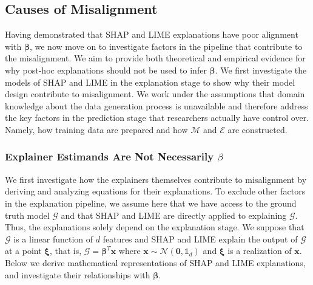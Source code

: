 \documentclass[mnsc,blindrev]{informs3}
\begin{document}
    \subsection{Causes of Misalignment}
        \label{sec:causes_of_misalignment}
        Having demonstrated that SHAP and LIME explanations have poor alignment with $\boldsymbol{\beta}$, we now move on to investigate factors in the pipeline that contribute to the misalignment. We aim to provide both theoretical and empirical evidence for why post-hoc explanations should not be used to infer $\boldsymbol{\beta}$. We first investigate the models of SHAP and LIME in the explanation stage to show why their model design contribute to misalignment. We work under the assumptions that domain knowledge about the data generation process is unavailable and therefore address the key factors in the prediction stage that researchers actually have control over. Namely, how training data are prepared and how $\mathcal{M}$ and $\mathcal{E}$ are constructed.%


    \subsubsection{Explainer Estimands Are Not Necessarily $\beta$}
    \label{sec:theoretical_considerations}
   We first investigate how the explainers themselves contribute to misalignment by deriving and analyzing equations for their explanations. To exclude other factors in the explanation pipeline, we assume here that we have access to the ground truth model $\mathcal{G}$ and that SHAP and LIME are directly applied to explaining $\mathcal{G}$. Thus, the explanations solely depend on the explanation stage. We suppose that $\mathcal{G}$ is a linear function of $d$ features and SHAP and LIME explain the output of $\mathcal{G}$ at a point $\boldsymbol{\xi}$, that is, $\mathcal{G} = \boldsymbol{\beta}^T \mathbf{x}$ where $\mathbf{x} \sim \mathcal{N}(\mathbf{0},\mathds{1}_d)$ and $\boldsymbol{\xi}$ is a realization of $\mathbf{x}$. Below we derive mathematical representations of SHAP and LIME explanations, and investigate their relationships with $\boldsymbol{\beta}$.
    
\end{document}
